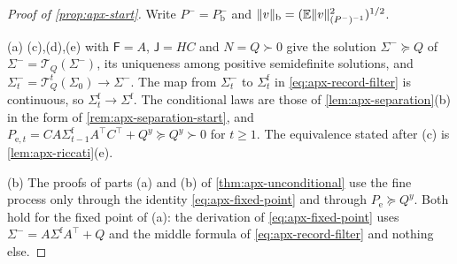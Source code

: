 \begin{proof}[Proof of \cref{prop:apx-start}]
Write $P^-=P^-_{\mathrm b}$ and $\Vert v\Vert_{\mathrm b}=(\mathbb{E}\Vert v\Vert^2_{(P^-)^{-1}})^{1/2}$.

(a) (c),(d),(e) with $\mathsf F=A$, $\mathsf J=HC$ and $N=Q\succ0$ give the solution $\Sigma^-\succeq Q$ of $\Sigma^-=\mathcal T_Q(\Sigma^-)$, its uniqueness among positive semidefinite solutions, and $\Sigma^-_t=\mathcal T_Q^t(\Sigma_0)\to\Sigma^-$. The map from $\Sigma^-_t$ to $\Sigma^{\mathrm f}_t$ in \cref{eq:apx-record-filter} is continuous, so $\Sigma^{\mathrm f}_t\to\Sigma^{\mathrm f}$. The conditional laws are those of \cref{lem:apx-separation}(b) in the form of \cref{rem:apx-separation-start}, and $P_{\mathrm e,t}=CA\Sigma^{\mathrm f}_{t-1}A^\top C^\top+Q^y\succeq Q^y\succ0$ for $t\ge1$. The equivalence stated after (c) is \cref{lem:apx-riccati}(e).

(b) The proofs of parts (a) and (b) of \cref{thm:apx-unconditional} use the fine process only through the identity \cref{eq:apx-fixed-point} and through $P_{\mathrm e}\succeq Q^y$. Both hold for the fixed point of (a): the derivation of \cref{eq:apx-fixed-point} uses $\Sigma^-=A\Sigma^{\mathrm f}A^\top+Q$ and the middle formula of \cref{eq:apx-record-filter} and nothing else.


\end{proof}
